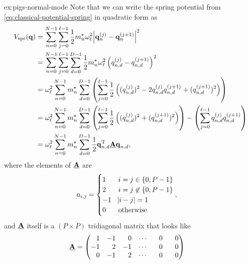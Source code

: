 \begin{DefAnswer}{ex:pigs-normal-mode}
	Note that we can write the spring potential from \cref{eq:classical-potential-spring} in quadratic form as
	\begin{subequations}
	\begin{align}
		V_\mathrm{spr}(\bm{\mathbf{q}})
		&= \sum_{n=0}^{N-1} \sum_{j=0}^{\ell - 1}
			\frac{1}{2} {m}^\star_n \omega_\ell^2 \abs{\bm{\mathbf{q}}_n^{(j)} - \bm{\mathbf{q}}_n^{(j+1)}}^2 \\
		&= \sum_{n=0}^{N-1} \sum_{j=0}^{\ell - 1} \sum_{d=0}^{D-1}
			\frac{1}{2} {m}^\star_n \omega_\ell^2 \left( q_{n,d}^{(j)} - q_{n,d}^{(j+1)} \right)^2 \\
		&= \omega_\ell^2 \sum_{n=0}^{N-1} {m}^\star_n \sum_{d=0}^{D-1} \left(
				\sum_{j=0}^{\ell - 1}
					\frac{1}{2} \left( (q_{n,d}^{(j)})^2 - 2 q_{n,d}^{(j)} q_{n,d}^{(j+1)} + (q_{n,d}^{(j+1)})^2 \right)
			\right) \\
		&= \omega_\ell^2 \sum_{n=0}^{N-1} {m}^\star_n \sum_{d=0}^{D-1} \left(
				\sum_{j=0}^{\ell - 1} \frac{1}{2} \left( (q_{n,d}^{(j)})^2 + (q_{n,d}^{(j+1)})^2 \right)
			\right) - \left(
				\sum_{j=0}^{\ell - 1} q_{n,d}^{(j)} q_{n,d}^{(j+1)}
			\right) \\
		&= \omega_\ell^2 \sum_{n=0}^{N-1} {m}^\star_n \sum_{d=0}^{D-1} \frac{1}{2} \bm{\mathbf{q}}_{n,d}^\mathrm{T} \underline{\bm{\mathbf{A}}} \bm{\mathbf{q}}_{n,d},
			\label{eq:pigs-spring-cartesian}
	\end{align}
	\end{subequations}
	where the elements of $\underline{\bm{\mathbf{A}}}$ are
	\begin{align}
		a_{i,j}
		&= \begin{cases}
				1 & i = j \in \{ 0, P-1 \} \\
				2 & i = j \not\in \{ 0, P-1 \} \\
				-1 & \abs{i - j} = 1 \\
				0 & \text{otherwise}
			\end{cases},
				\label{eq:nm-matrix}
	\end{align}
	and $\underline{\bm{\mathbf{A}}}$ itself is a $(P \times P)$ tridiagonal matrix that looks like
	\begin{align}
		\underline{\bm{\mathbf{A}}}
		&= \begin{pmatrix}
				\phantom{-}1 & -1 & \phantom{-}0 & \cdots & \phantom{-}0 & \phantom{-}0 \\
				-1 & \phantom{-}2 & -1 & \cdots & \phantom{-}0 & \phantom{-}0 \\
				\phantom{-}0 & -1 & \phantom{-}2 & \cdots & \phantom{-}0 & \phantom{-}0 \\

\end{pmatrix}
\end{align}
\end{DefAnswer}
